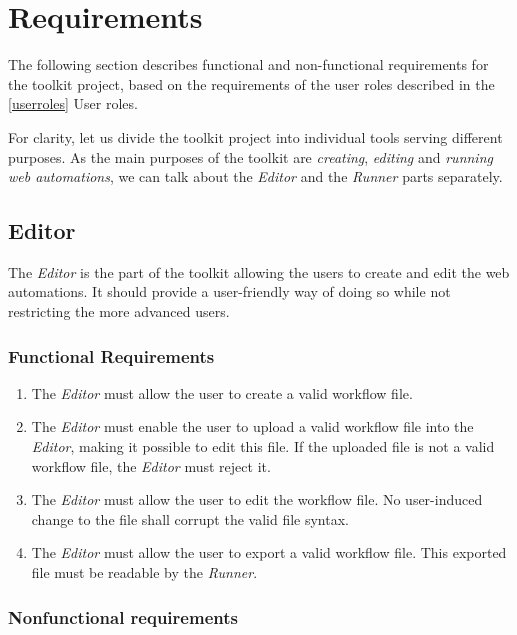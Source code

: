 \section{Requirements}
\label{requirements}

The following section describes functional and non-functional requirements for the toolkit project, 
based on the requirements of the user roles described in the \autoref{userroles} User roles.

For clarity, let us divide the toolkit project into individual tools serving different purposes.
As the main purposes of the toolkit are \textit{creating}, \textit{editing} and \textit{running web automations},
we can talk about the \textit{Editor} and the \textit{Runner} parts separately.

\subsection{Editor}

The \textit{Editor} is the part of the toolkit allowing the users to create and edit the web automations.
It should provide a user-friendly way of doing so while not restricting the more advanced users.

\smallskip

\subsubsection{Functional Requirements}

\begin{enumerate}[label=\thesubsection.1.\arabic*]
    \item The \textit{Editor} must allow the user to create a valid workflow file.
    \item The \textit{Editor} must enable the user to upload a valid workflow file into the \textit{Editor}, 
    making it possible to edit this file. If the uploaded file is not a valid workflow file, the \textit{Editor}
    must reject it.
    \item The \textit{Editor} must allow the user to edit the workflow file. 
    No user-induced change to the file shall corrupt the valid file syntax.
    \item The \textit{Editor} must allow the user to export a valid workflow file. 
    This exported file must be readable by the \textit{Runner}.
\end{enumerate}

\subsubsection{Nonfunctional requirements}

